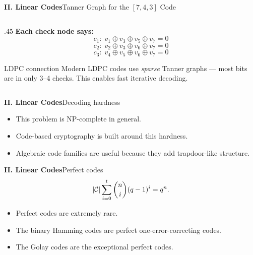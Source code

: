 \begin{frame}{\textbf{II. Linear Codes}}{Tanner Graph for the $[7,4,3]$ Code}
\begin{columns}[T,onlytextwidth]
\begin{column}{.45\textwidth}
    \medskip
    \textcolor{TealDarkCyan}{\textbf{Each check node says:}}
    \[
      c_1{:}\; v_1 \oplus v_3 \oplus v_5 \oplus v_7 = 0
    \]
    \[
      c_2{:}\; v_2 \oplus v_3 \oplus v_6 \oplus v_7 = 0
    \]
    \[
      c_3{:}\; v_4 \oplus v_5 \oplus v_6 \oplus v_7 = 0
    \]

    \medskip
    \begin{block}{LDPC connection}
    Modern LDPC codes use \emph{sparse} Tanner graphs --- most bits are in only 3--4 checks. This enables fast iterative decoding.
    \end{block}
  \end{column}
\end{columns}
\end{frame}

\begin{frame}{\textbf{II. Linear Codes}}{Decoding hardness}
\small
{}
\begin{itemize}
  \item This problem is NP-complete in general.
  \item Code-based cryptography is built around this hardness.
  \item Algebraic code families are useful because they add trapdoor-like structure.
\end{itemize}
\end{frame}

\begin{frame}{\textbf{II. Linear Codes}}{Perfect codes}
\small
{}
\[
  |\mathcal{C}|\sum_{i=0}^t \binom{n}{i}(q-1)^i=q^n.
\]
\begin{itemize}
  \item Perfect codes are extremely rare.
  \item The binary Hamming codes are perfect one-error-correcting codes.
  \item The Golay codes are the exceptional perfect codes.
\end{itemize}
\end{frame}

